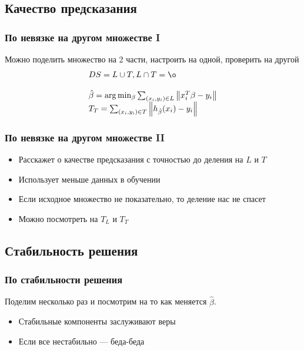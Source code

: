 \documentclass[14pt, fleqn, xcolor={dvipsnames, table}, hyperref={unicode}, babel={english,russian}, inputenc=utf8x]{beamer}
\begin{document}
\subsection{Качество предсказания}

\begin{frame}[t]\frametitle{По невязке на другом множестве I}
Можно поделить множество на 2 части, настроить на одной, проверить на другой
$$
  \begin{array}{ll}
    DS = L \cup T, L \cap T = \o \\
    \\
    \hat{\beta} = \arg\min_{\beta} \sum_{(x_i,y_i) \in L} \left\| x_i^T\beta - y_i \right\| \\
    T_T = \sum_{(x_i,y_i) \in T} \left\| h_{\hat{\beta}}(x_i) - y_i \right\|
  \end{array}
$$
\end{frame}

\begin{frame}[t]\frametitle{По невязке на другом множестве II}
\begin{itemize}
  \item Расскажет о качестве предсказания с точностью до деления на $L$ и $T$
  \item Использует меньше данных в обучении
  \item Если исходное множество не показательно, то деление нас не спасет
  \item Можно посмотреть на $T_L$ и $T_T$
\end{itemize}
\end{frame}

\subsection{Стабильность решения}

\begin{frame}[t]\frametitle{По стабильности решения}
Поделим несколько раз и посмотрим на то как меняется $\hat{\beta}$.
\begin{itemize}
  \item Стабильные компоненты заслуживают веры
  \item Если все нестабильно --- беда-беда
\end{itemize}
\end{frame}
\end{document}

